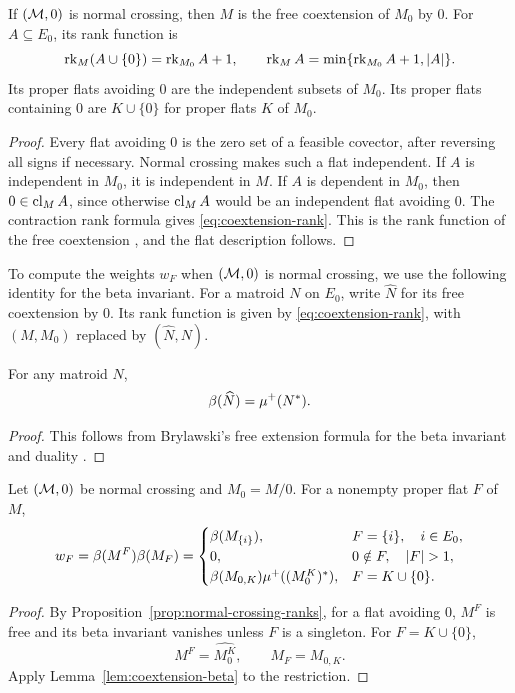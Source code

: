 \begin{proposition}\label{prop:normal-crossing-ranks}
If $(\mathcal M,0)$ is normal crossing, then $M$ is the free coextension of $M_0$ by $0$.
For $A\subseteq E_0$, its rank function is
\begin{equation}\label{eq:coextension-rank}
 \operatorname{rk}_M(A\cup\{0\})=\operatorname{rk}_{M_0}A+1,\qquad
 \operatorname{rk}_M A=\min\{\operatorname{rk}_{M_0}A+1,|A|\}.
\end{equation}
Its proper flats avoiding $0$ are the independent subsets of $M_0$.
Its proper flats containing $0$ are $K\cup\{0\}$ for proper flats
$K$ of $M_0$.
\end{proposition}
\begin{proof}
Every flat avoiding $0$ is the zero set of a feasible covector,
after reversing all signs if necessary. Normal crossing makes such
a flat independent. If $A$ is independent in $M_0$, it is independent
in $M$. If $A$ is dependent in $M_0$, then $0\in\operatorname{cl}_M A$, since
otherwise $\operatorname{cl}_M A$ would be an independent flat avoiding $0$.
The contraction rank formula gives \eqref{eq:coextension-rank}.
This is the rank function of the free coextension
\cite[Sections 7.2--7.3]{Oxley2011}, and the flat description follows.
\end{proof}

To compute the weights $w_F$ when $(\mathcal M,0)$ is normal crossing, we
use the following identity for the beta invariant.
For a matroid $N$ on $E_0$, write $\widehat N$ for its free coextension
by $0$. Its rank function is given by \eqref{eq:coextension-rank}, with
$(M,M_0)$ replaced by $(\widehat N,N)$.

\begin{lemma}\label{lem:coextension-beta}
For any matroid $N$,
\[
 \beta(\widehat N)=\mu^+(N^*).
\]
\end{lemma}
\begin{proof}
This follows from Brylawski's free extension formula for the beta
invariant and duality
\cite[Remarks 6.15(3)(b) and (d), p.~241]{Brylawski1982}.
\end{proof}

\begin{lemma}\label{lem:free-coextension}
Let $(\mathcal M,0)$ be normal crossing and $M_0=M/0$. For a nonempty proper
flat $F$ of $M$, 
\[
 w_F= \beta(M^F)\beta(M_F) = 
 \begin{cases}
  \beta(M_{\{i\}}),&F=\{i\},\quad i\in E_0,\\
  0,&0\notin F,\quad |F|>1,\\
  \beta(M_{0,K})\mup((M_0^K)^*),&F=K\cup\{0\}.
 \end{cases}
\]
\end{lemma}
\begin{proof}
By Proposition~\ref{prop:normal-crossing-ranks}, for a flat avoiding
$0$, $M^F$ is free and its beta invariant vanishes unless
$F$ is a singleton. For $F=K\cup\{0\}$,
\[
 M^F=\widehat{M_0^K},\qquad M_F=M_{0,K}.
\]
Apply Lemma~\ref{lem:coextension-beta} to the restriction.
\end{proof}

